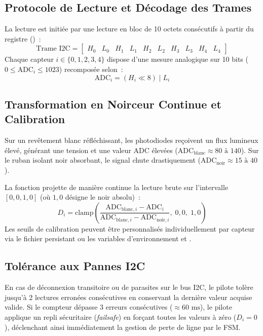 \subsection{Protocole de Lecture et Décodage des Trames}
La lecture est initiée par une lecture en bloc de 10 octets consécutifs à partir du registre  ()~:
\begin{equation}
    \text{Trame I2C} = \begin{bmatrix} H_0 & L_0 & H_1 & L_1 & H_2 & L_2 & H_3 & L_3 & H_4 & L_4 \end{bmatrix}
\end{equation}
Chaque capteur $i \in \{0, 1, 2, 3, 4\}$ dispose d'une mesure analogique sur 10 bits ($0 \le \text{ADC}_i \le 1023$) recomposée selon~:
\begin{equation}
    \text{ADC}_i = (H_i \ll 8) \;|\; L_i
\end{equation}

\subsection{Transformation en Noirceur Continue et Calibration}
Sur un revêtement blanc réfléchissant, les photodiodes reçoivent un flux lumineux élevé, générant une tension et une valeur ADC élevées ($\text{ADC}_{\text{blanc}} \approx 80 \text{ à } 140$). Sur le ruban isolant noir absorbant, le signal chute drastiquement ($\text{ADC}_{\text{noir}} \approx 15 \text{ à } 40$).

La fonction  projette de manière continue la lecture brute sur l'intervalle $[0{,}0, 1{,}0]$ (où $1{,}0$ désigne le noir absolu)~:
\begin{equation}
    D_i = \text{clamp}\left(\frac{\text{ADC}_{\text{blanc}, i} - \text{ADC}_i}{\text{ADC}_{\text{blanc}, i} - \text{ADC}_{\text{noir}, i}}, \; 0{,}0, \; 1{,}0\right)
\end{equation}
Les seuils de calibration peuvent être personnalisés individuellement par capteur via le fichier persistant  ou les variables d'environnement  et .

\subsection{Tolérance aux Pannes I2C}
En cas de déconnexion transitoire ou de parasites sur le bus I2C, le pilote tolère jusqu'à 2 lectures erronées consécutives en conservant la dernière valeur acquise valide. Si le compteur dépasse 3 erreurs consécutives ($\approx 60\text{ ms}$), le pilote applique un repli sécuritaire (\emph{failsafe}) en forçant toutes les valeurs à zéro ($D_i = 0$), déclenchant ainsi immédiatement la gestion de perte de ligne par le FSM.

